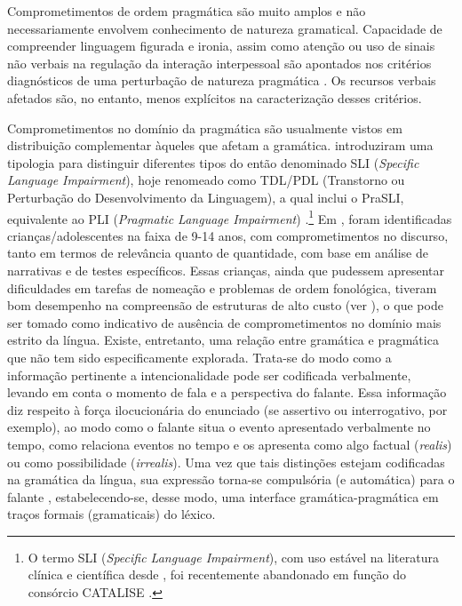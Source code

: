\documentclass[output=paper,colorlinks,citecolor=brown,booklanguage=portuguese]{langscibook}
\begin{document}
Comprometimentos de ordem pragmática são muito amplos e não necessariamente envolvem conhecimento de natureza gramatical. Capacidade de compreender linguagem figurada e ironia, assim como atenção ou uso de sinais não verbais na regulação da interação interpessoal são apontados nos critérios diagnósticos de uma perturbação de natureza pragmática \citep{Ketelaars2017}. Os recursos verbais afetados são, no entanto, menos explícitos na caracterização desses critérios.

Comprometimentos no domínio da pragmática são usualmente vistos em distribuição complementar àqueles que afetam a gramática. \citet{Friedmann2008} introduziram uma tipologia para distinguir diferentes tipos do então denominado SLI (\emph{Specific Language Impairment}), hoje renomeado como TDL/PDL (Transtorno ou Perturbação do Desenvolvimento da Linguagem), a qual inclui o PraSLI, equivalente ao PLI (\emph{Pragmatic Language Impairment}) \citep{Bishop1989, Norbury2002}.\footnote{O termo SLI (\emph{Specific Language Impairment}), com uso estável na literatura clínica e científica desde \citet{Fey1983}, foi recentemente abandonado em função do consórcio CATALISE \citep{Bishop2016}.} Em \citet{Friedmann2008}, foram identificadas crianças/adolescentes na faixa de 9-14 anos, com comprometimentos no discurso, tanto em termos de relevância quanto de quantidade, com base em análise de narrativas e de testes específicos. Essas crianças, ainda que pudessem apresentar dificuldades em tarefas de nomeação e problemas de ordem fonológica, tiveram bom desempenho na compreensão de estruturas de alto custo (ver ), o que pode ser tomado como indicativo de ausência de comprometimentos no domínio mais estrito da língua. Existe, entretanto, uma relação entre gramática e pragmática que não tem sido especificamente explorada. Trata-se do modo como a informação pertinente a intencionalidade pode ser codificada verbalmente, levando em conta o momento de fala e a perspectiva do falante. Essa informação diz respeito à força ilocucionária do enunciado (se assertivo ou interrogativo, por exemplo), ao modo como o falante situa o evento apresentado verbalmente no tempo, como relaciona eventos no tempo e os apresenta como algo factual (\emph{realis}) ou como possibilidade (\emph{irrealis}). Uma vez que tais distinções estejam codificadas na gramática da língua, sua expressão torna-se compulsória (e automática) para o falante \citep{Slobin1996}, estabelecendo-se, desse modo, uma interface gramática-pragmática em traços formais (gramaticais) do léxico.
\end{document}
